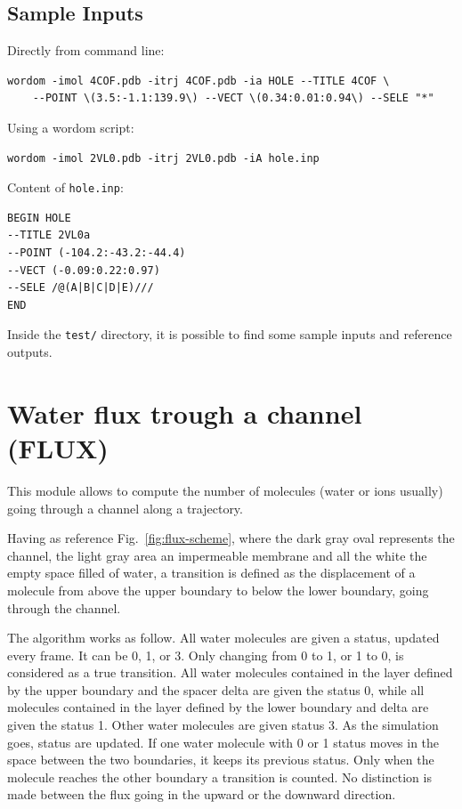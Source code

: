 \documentclass[11pt,twoside,onecolumn,a4paper,openright,notitlepage]{book}[2001/04/21]
\begin{document}
\clearpage
\subsection*{Sample Inputs}

Directly from command line:
\begin{verbatim}
wordom -imol 4COF.pdb -itrj 4COF.pdb -ia HOLE --TITLE 4COF \
    --POINT \(3.5:-1.1:139.9\) --VECT \(0.34:0.01:0.94\) --SELE "*" 
\end{verbatim}
Using a wordom script:
\begin{verbatim}
wordom -imol 2VL0.pdb -itrj 2VL0.pdb -iA hole.inp  
\end{verbatim}
Content of \verb#hole.inp#: 
\begin{verbatim}
BEGIN HOLE
--TITLE 2VL0a
--POINT (-104.2:-43.2:-44.4)
--VECT (-0.09:0.22:0.97)
--SELE /@(A|B|C|D|E)///
END
\end{verbatim}
Inside the \verb#test/# directory, it is possible to find some sample inputs and reference outputs. 



\clearpage
\section{Water flux trough a channel (FLUX)}

This module allows to compute the number of molecules (water or ions usually) going through a channel along a trajectory. 

Having as reference Fig.~\ref{fig:flux-scheme}, where the dark gray oval represents the channel, the light gray area an impermeable membrane and all the white the empty space filled of water, a transition is defined as the displacement of a molecule from above the upper boundary to below the lower boundary, going through the channel. 

The algorithm works as follow. All water molecules are given a status, updated every frame. It can be 0, 1, or 3. Only changing from 0 to 1, or 1 to 0, is considered as a true transition. All water molecules contained in the layer defined by the upper boundary and the spacer delta are given the status 0, while all molecules contained in the layer defined by the lower boundary and delta are given the status 1. Other water molecules are given status 3. As the simulation goes, status are updated. If one water molecule with 0 or 1 status moves in the space between the two boundaries, it keeps its previous status. Only when the molecule reaches the other boundary a transition is counted. No distinction is made between the flux going in the upward or the downward direction.
\end{document}
